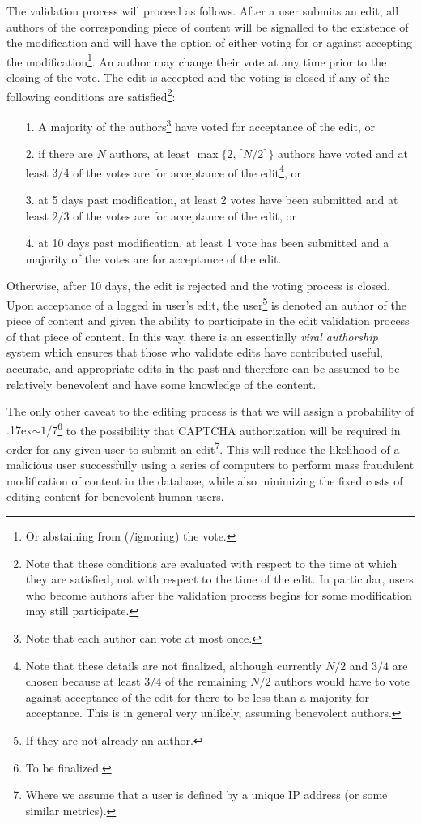 \documentclass[12pt,letterpaper]{article}
\begin{document}
The validation process will proceed as follows. After a user submits an edit, all authors of the corresponding piece of content will be signalled to the existence of the modification and will have the option of either voting for or against accepting the modification\footnote{Or abstaining from (/ignoring) the vote.}. An author may change their vote at any time prior to the closing of the vote. The edit is accepted and the voting is closed if any of the following conditions are satisfied\footnote{Note that these conditions are evaluated with respect to the time at which they are satisfied, not with respect to the time of the edit. In particular, users who become authors after the validation process begins for some modification may still participate.}:
\begin{enumerate}
\item[1.] A majority of the authors\footnote{Note that each author can vote at most once.} have voted for acceptance of the edit, or
\item[2.] if there are $N$ authors, at least $\max\{2, \lceil N/2 \rceil\}$ authors have voted and at least $3/4$ of the votes are for acceptance of the edit\footnote{Note that these details are not finalized, although currently $N/2$ and $3/4$ are chosen because at least $3/4$ of the remaining $N/2$ authors would have to vote against acceptance of the edit for there to be less than a majority for acceptance. This is in general very unlikely, assuming benevolent authors.}, or
\item[3.] at 5 days past modification, at least 2 votes have been submitted and at least $2/3$ of the votes are for acceptance of the edit, or
\item[4.] at 10 days past modification, at least 1 vote has been submitted and a majority of the votes are for acceptance of the edit.
\end{enumerate}
Otherwise, after 10 days, the edit is rejected and the voting process is closed. Upon acceptance of a logged in user's edit, the user\footnote{If they are not already an author.} is denoted an author of the piece of content and given the ability to participate in the edit validation process of that piece of content. In this way, there is an essentially \textit{viral authorship} system which ensures that those who validate edits have contributed useful, accurate, and appropriate edits in the past and therefore can be assumed to be relatively benevolent and have some knowledge of the content. 

The only other caveat to the editing process is that we will assign a probability of {\raise.17ex\hbox{$\scriptstyle\mathtt{\sim}$}}$1/7$\footnote{To be finalized.} to the possibility that CAPTCHA authorization will be required in order for any given user to submit an edit\footnote{Where we assume that a user is defined by a unique IP address (or some similar metrics).}. This will reduce the likelihood of a malicious user successfully using a series of computers to perform mass fraudulent modification of content in the database, while also minimizing the fixed costs of editing content for benevolent human users.
\end{document}

